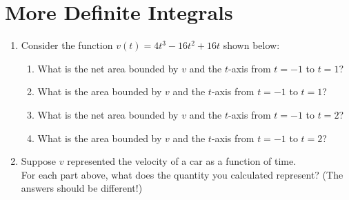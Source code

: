 \documentclass[10pt]{article}
\begin{document}
    \section{More Definite Integrals}
     \begin{enumerate}
    
    \item Consider the function $v(t) = 4t^3-16t^2+16t$ shown below:
    \begin{center}
    \end{center}

    \begin{enumerate}
        
        \item What is the net area bounded by $v$ and the $t$-axis from $t = -1$ to $t = 1$?\\
        
        \item What is the area bounded by $v$ and the $t$-axis from $t = -1$ to $t = 1$?\\
        
        \item What is the net area bounded by $v$ and the $t$-axis from $t = -1$ to $t = 2$?\\
        
        \item What is the area bounded by $v$ and the $t$-axis from $t = -1$ to $t = 2$?
    \end{enumerate}

    \item Suppose $v$ represented the velocity of a car as a function of time.\\
    For each part above, what does the quantity you calculated represent? (The answers should be different!)
    
\end{enumerate}

     
\end{document}
